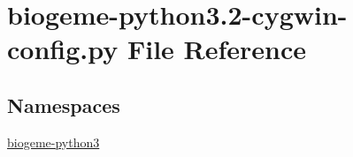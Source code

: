 \hypertarget{biogeme-python3_82-cygwin-config_8py}{\section{biogeme-\/python3.2-\/cygwin-\/config.py File Reference}
\label{biogeme-python3_82-cygwin-config_8py}
}
\subsection*{Namespaces}
\begin{DoxyCompactItemize}
\item 
 \hyperlink{namespacebiogeme-python3}{biogeme-\/python3}
\end{DoxyCompactItemize}
